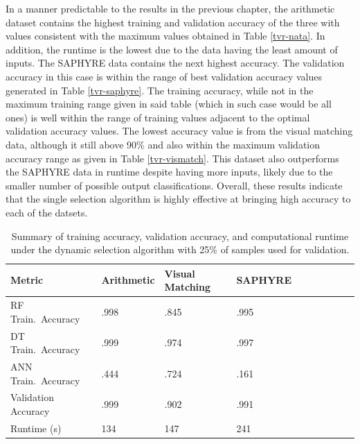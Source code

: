 \documentclass[12pt]{uthesis-v12}  %
\begin{document}
In a manner predictable to the results in the previous chapter, the arithmetic dataset contains the highest training and validation accuracy of the three with values consistent with the maximum values obtained in Table \ref{tvr-nata}. In addition, the runtime is the lowest due to the data having the least amount of inputs. The SAPHYRE data contains the next highest accuracy. The validation accuracy in this case is within the range of best validation accuracy values generated in Table \ref{tvr-saphyre}. The training accuracy, while not in the maximum training range given in said table (which in such case would be all ones) is well within the range of training values adjacent to the optimal validation accuracy values. The lowest accuracy value is from the visual matching data, although it still above 90\% and also within the maximum validation accuracy range as given in Table \ref{tvr-vismatch}. This dataset also outperforms the SAPHYRE data in runtime despite having more inputs, likely due to the smaller number of possible output classifications. Overall, these results indicate that the single selection algorithm is highly effective at bringing high accuracy to each of the datsets.

\begin{table}[!t]
\caption{Summary of training accuracy, validation accuracy, and computational runtime under the dynamic selection algorithm with 25\% of samples used for validation.}
\renewcommand{\arraystretch}{1.3}
\centering
{\begin{tabular}{*{10}{l}}
\toprule
Metric & Arithmetic & Visual Matching & SAPHYRE \\ \midrule
RF Train.~Accuracy & .998 & .845 & .995 \\
DT Train.~Accuracy & .999 & .974 & .997 \\
ANN Train.~Accuracy & .444 & .724 & .161 \\
Validation Accuracy & .999 & .902 & .991 \\
Runtime (s) & 134 & 147 & 241 \\ \bottomrule
\end{tabular}}

\label{dyn-all}
\end{table}
	
\end{document}
